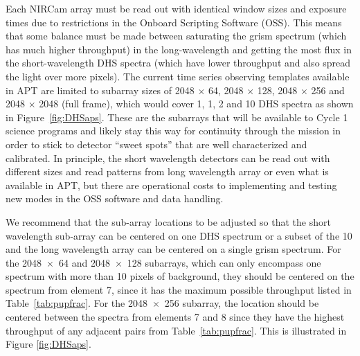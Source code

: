 \documentclass[iop]{emulateapj}
\begin{document}
Each NIRCam array must be read out with identical window sizes and exposure times due to restrictions in the Onboard Scripting Software (OSS).
This means that some balance must be made between saturating the grism spectrum (which has much higher throughput) in the long-wavelength and getting the most flux in the short-wavelength DHS spectra (which have lower throughput and also spread the light over more pixels).
The current time series observing templates available in APT are limited to subarray sizes of 2048 $\times$ 64, 2048 $\times$ 128, 2048 $\times$ 256 and 2048 $\times$ 2048 (full frame), which would cover 1, 1, 2 and 10 DHS spectra as shown in Figure~\ref{fig:DHSaps}.
These are the subarrays that will be available to Cycle 1 science programs and likely stay this way for continuity through the mission in order to stick to detector ``sweet spots'' that are well characterized and calibrated.
In principle, the short wavelength detectors can be read out with different sizes and read patterns from long wavelength array or even what is available in APT, but there are operational costs to implementing and testing new modes in the OSS software and data handling.

We recommend that the sub-array locations to be adjusted so that the short wavelength sub-array can be centered on one DHS spectrum or a subset of the 10 and the long wavelength array can be centered on a single grism spectrum. For the 2048~$\times$~64 and 2048~$\times$~128 subarrays, which can only encompass one spectrum with more than 10 pixels of background, they should be centered on the spectrum from element 7, since it has the maximum possible throughput listed in Table~\ref{tab:pupfrac}. For the 2048~$\times$~256 subarray, the location should be centered between the spectra from elements 7 and 8 since they have the highest throughput of any adjacent pairs from Table~\ref{tab:pupfrac}. This is illustrated in Figure \ref{fig:DHSaps}.
\end{document}
